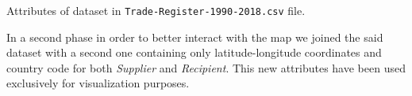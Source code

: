 \documentclass{article}
\begin{document}
\begin{multicols}{2}
\begin{center}
\begin{table}[hbt!]
		\label{tab: d1}
		\caption { \label { tab:d1} Attributes of dataset in \texttt{Trade-Register-1990-2018.csv} file.  }
		
	\end{table}
\end{center}




\begin{center}
	\begin{table}[hbt!]
		\label{tab:d2}
		
		\caption { \label { tab:d2} Attributes of dataset in \texttt{importNumbers1989-2018.csv} file.   }
		
	\end{table}
	
\end{center}

In a second phase in order to better interact with the map we joined the said dataset with a second one containing only latitude-longitude coordinates and country code for both \textit{Supplier} and \textit{Recipient}. This new attributes have been used exclusively for visualization purposes.


\end{multicols}
\end{document}

